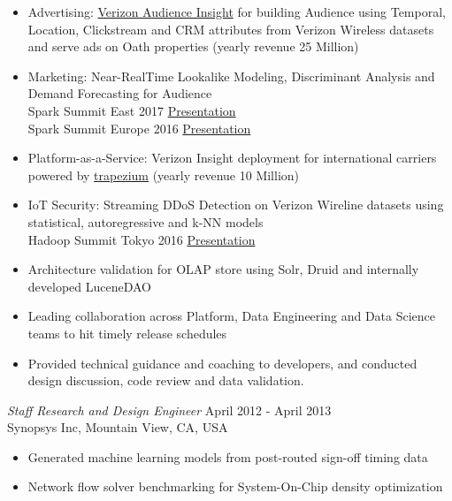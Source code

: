 \documentclass[margin]{res}
\begin{document}
\begin{resume}
\begin{itemize}
\item Advertising: \href{https://verizoninsights.verizon.com} {Verizon
  Audience Insight} for building Audience using Temporal, Location,
  Clickstream and CRM attributes from Verizon Wireless datasets and 
  serve ads on Oath properties (yearly revenue 25 Million)

\item Marketing: Near-RealTime Lookalike Modeling, Discriminant Analysis and Demand Forecasting for Audience\\
Spark Summit East 2017 
\href{https://spark-summit.org/east-2017/events/realtime-analytical-query-processing-and-predictive-model-building-on-high-dimensional-document-datasets-with-timestamps}{Presentation}\\
Spark Summit Europe 2016 \href{http://www.slideshare.net/SparkSummit/spark-summit-eu-talk-by-debasish-das-and-pramod-narasimha-68928564}{Presentation}

\item Platform-as-a-Service: Verizon Insight deployment for international carriers powered by \href{https://github.com/Verizon/trapezium}{trapezium} (yearly revenue 10 Million)

\item IoT Security: Streaming DDoS Detection on Verizon Wireline datasets using statistical, autoregressive and k-NN models\\
Hadoop Summit Tokyo 2016 \href{http://www.slideshare.net/HadoopSummit/near-realtime-network-anomaly-detection-and-traffic-analysis-using-spark-based-lambda-architecture}{Presentation}

\item Architecture validation for OLAP store using Solr, Druid and internally developed LuceneDAO 

\item Leading collaboration across Platform, Data Engineering and Data Science teams to hit timely release schedules

\item Provided technical guidance and coaching to developers, and conducted design discussion, code review and data validation.

\end{itemize}

{\sl Staff Research and Design Engineer} \hfill April 2012 - April 2013\\
Synopsys Inc, Mountain View, CA, USA
\begin{itemize} \itemsep -2pt
\item Generated machine learning models from post-routed sign-off timing data
\item Network flow solver benchmarking for System-On-Chip density optimization
\end{itemize}


\end{resume}
\end{document}
